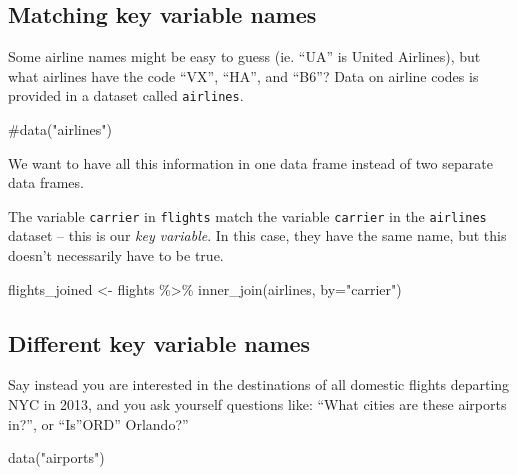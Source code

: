 \documentclass[
  letterpaper,
  DIV=11,
  numbers=noendperiod]{scrartcl}
\newenvironment{Shaded}{\begin{snugshade}}{\end{snugshade}}
\newcommand{\AttributeTok}[1]{\textcolor[rgb]{0.40,0.45,0.13}{#1}}
\newcommand{\CommentTok}[1]{\textcolor[rgb]{0.37,0.37,0.37}{#1}}
\newcommand{\FunctionTok}[1]{\textcolor[rgb]{0.28,0.35,0.67}{#1}}
\newcommand{\NormalTok}[1]{\textcolor[rgb]{0.00,0.23,0.31}{#1}}
\newcommand{\OtherTok}[1]{\textcolor[rgb]{0.00,0.23,0.31}{#1}}
\newcommand{\SpecialCharTok}[1]{\textcolor[rgb]{0.37,0.37,0.37}{#1}}
\newcommand{\StringTok}[1]{\textcolor[rgb]{0.13,0.47,0.30}{#1}}
\begin{document}
\hypertarget{matching-key-variable-names}{%
\subsection{Matching key variable
names}\label{matching-key-variable-names}}

Some airline names might be easy to guess (ie. ``UA'' is United
Airlines), but what airlines have the code ``VX'', ``HA'', and ``B6''?
Data on airline codes is provided in a dataset called \texttt{airlines}.

\begin{Shaded}
\begin{Highlighting}[]
\CommentTok{\#data("airlines")}
\end{Highlighting}
\end{Shaded}

We want to have all this information in one data frame instead of two
separate data frames.

The variable \texttt{carrier} in \texttt{flights} match the variable
\texttt{carrier} in the \texttt{airlines} dataset -- this is our
\emph{key variable}. In this case, they have the same name, but this
doesn't necessarily have to be true.

\begin{Shaded}
\begin{Highlighting}[]
\NormalTok{flights\_joined }\OtherTok{\textless{}{-}}\NormalTok{ flights }\SpecialCharTok{\%\textgreater{}\%} 
  \FunctionTok{inner\_join}\NormalTok{(airlines, }\AttributeTok{by=}\StringTok{"carrier"}\NormalTok{)}
\end{Highlighting}
\end{Shaded}

\hypertarget{different-key-variable-names}{%
\subsection{Different key variable
names}\label{different-key-variable-names}}

Say instead you are interested in the destinations of all domestic
flights departing NYC in 2013, and you ask yourself questions like:
``What cities are these airports in?'', or ``Is''ORD'' Orlando?''

\begin{Shaded}
\begin{Highlighting}[]
\FunctionTok{data}\NormalTok{(}\StringTok{"airports"}\NormalTok{)}
\end{Highlighting}
\end{Shaded}
\end{document}
